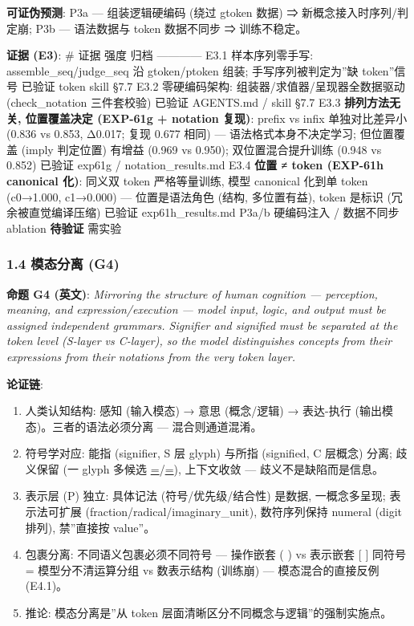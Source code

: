 \documentclass[
]{article}
\providecommand{\tightlist}{%
  \setlength{\itemsep}{0pt}\setlength{\parskip}{0pt}}
\begin{document}
\textbf{可证伪预测}: P3a --- 组装逻辑硬编码 (绕过 gtoken 数据) ⇒
新概念接入时序列/判定崩; P3b --- 语法数据与 token 数据不同步 ⇒
训练不稳定。

\textbf{证据 (E3)}: \textbar{} \# \textbar{} 证据 \textbar{} 强度
\textbar{} 归档 \textbar{}
\textbar---\textbar---\textbar---\textbar---\textbar{} \textbar{} E3.1
\textbar{} 样本序列零手写: assemble\_seq/judge\_seq 沿 gtoken/ptoken
组装; 手写序列被判定为''缺 token''信号 \textbar{} 已验证 \textbar{}
token skill §7.7 \textbar{} \textbar{} E3.2 \textbar{} 零硬编码架构:
组装器/求值器/呈现器全数据驱动 (check\_notation 三件套校验) \textbar{}
已验证 \textbar{} AGENTS.md / skill §7.7 \textbar{} \textbar{} E3.3
\textbar{} \textbf{排列方法无关, 位置覆盖决定 (EXP-61g + notation
复现)}: prefix vs infix 单独对比差异小 (0.836 vs 0.853, Δ0.017; 复现
0.677 相同) --- 语法格式本身不决定学习; 但位置覆盖 (imply 判定位置)
有增益 (0.969 vs 0.950); 双位置混合提升训练 (0.948 vs 0.852) \textbar{}
已验证 \textbar{} exp61g / notation\_results.md \textbar{} \textbar{}
E3.4 \textbar{} \textbf{位置 ≠ token (EXP-61h canonical 化)}: 同义双
token 严格等量训练, 模型 canonical 化到单 token (c0→1.000, c1→0.000) ---
位置是语法角色 (结构, 多位置有益), token 是标识 (冗余被直觉编译压缩)
\textbar{} 已验证 \textbar{} exp61h\_results.md \textbar{} \textbar{}
P3a/b \textbar{} 硬编码注入 / 数据不同步 ablation \textbar{}
\textbf{待验证} \textbar{} 需实验 \textbar{}

\subsubsection{1.4 模态分离 (G4)}\label{ux6a21ux6001ux5206ux79bb-g4}

\textbf{命题 G4 (英文)}: \emph{Mirroring the structure of human
cognition --- perception, meaning, and expression/execution --- model
input, logic, and output must be assigned independent grammars.
Signifier and signified must be separated at the token level (S-layer vs
C-layer), so the model distinguishes concepts from their expressions
from their notations from the very token layer.}

\textbf{论证链}:

\begin{enumerate}
\def\labelenumi{\arabic{enumi}.}
\tightlist
\item
  人类认知结构: 感知 (输入模态) → 意思 (概念/逻辑) → 表达-执行
  (输出模态)。三者的语法必须分离 --- 混合则通道混淆。
\item
  符号学对应: 能指 (signifier, S 层 glyph) 与所指 (signified, C 层概念)
  分离; 歧义保留 (一 glyph 多候选 \href{D:260}{=}/\href{D:261}{=}),
  上下文收敛 --- 歧义不是缺陷而是信息。
\item
  表示层 (P) 独立: 具体记法 (符号/优先级/结合性) 是数据, 一概念多呈现;
  表示法可扩展 (fraction/radical/imaginary\_unit), 数符序列保持 numeral
  (digit 排列), 禁''直接按 value''。
\item
  包裹分离: 不同语义包裹必须不同符号 --- 操作嵌套 ( ) vs 表示嵌套 {[}
  {]} 同符号 = 模型分不清运算分组 vs 数表示结构 (训练崩) ---
  模态混合的直接反例 (E4.1)。
\item
  推论: 模态分离是''从 token 层面清晰区分不同概念与逻辑''的强制实施点。
\end{enumerate}
\end{document}
